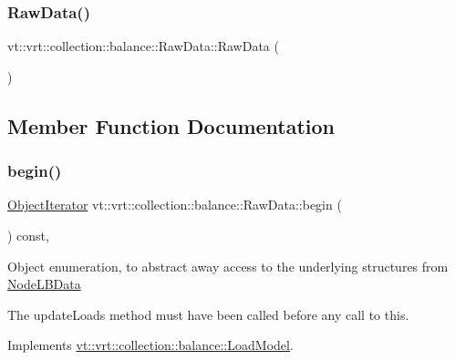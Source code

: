 \subsubsection{\texorpdfstring{Raw\+Data()}{RawData()}}
{\footnotesize\ttfamily vt\+::vrt\+::collection\+::balance\+::\+Raw\+Data\+::\+Raw\+Data (\begin{DoxyParamCaption}{ }\end{DoxyParamCaption})\hspace{0.3cm}{\ttfamily [default]}}



\subsection{Member Function Documentation}
\mbox{\label{structvt_1_1vrt_1_1collection_1_1balance_1_1_raw_data_acfe356d51313995dacf50868f3fac19b}} 
\subsubsection{\texorpdfstring{begin()}{begin()}}
{\footnotesize\ttfamily \hyperlink{structvt_1_1vrt_1_1collection_1_1balance_1_1_object_iterator}{Object\+Iterator} vt\+::vrt\+::collection\+::balance\+::\+Raw\+Data\+::begin (\begin{DoxyParamCaption}{ }\end{DoxyParamCaption}) const\hspace{0.3cm}{\ttfamily [override]}, {\ttfamily [virtual]}}

Object enumeration, to abstract away access to the underlying structures from \hyperlink{structvt_1_1vrt_1_1collection_1_1balance_1_1_node_l_b_data}{Node\+L\+B\+Data}

The {\ttfamily update\+Loads} method must have been called before any call to this. 

Implements \hyperlink{structvt_1_1vrt_1_1collection_1_1balance_1_1_load_model_a085a13e3cfeff2beb88b49ddaed4ef8d}{vt\+::vrt\+::collection\+::balance\+::\+Load\+Model}.

\mbox{\label{structvt_1_1vrt_1_1collection_1_1balance_1_1_raw_data_adc3d74f514051c2b0dad8ba9b65e2d1a}} 
